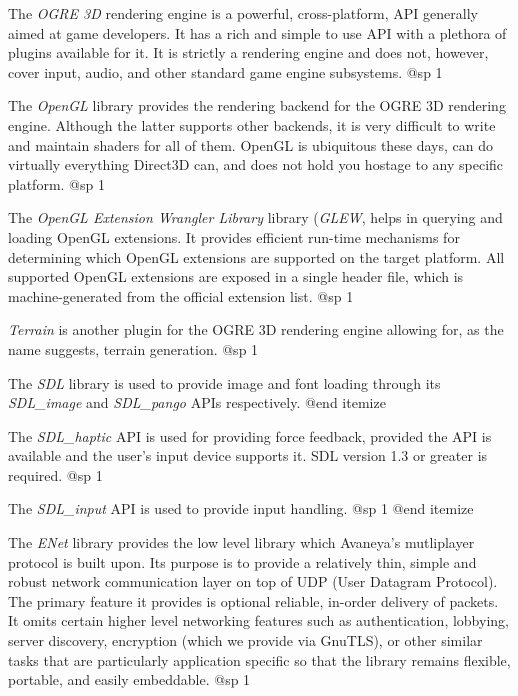 \item
The {\sl OGRE 3D} rendering engine is a powerful, cross-platform, API generally aimed at game developers. It has a rich and simple to use API with a plethora of plugins available for it. It is strictly a rendering engine and does not, however, cover input, audio, and other standard game engine subsystems.
@sp 1

\item
The {\sl OpenGL} library provides the rendering backend for the OGRE 3D rendering engine. Although the latter supports other backends, it is very difficult to write and maintain shaders for all of them. OpenGL is ubiquitous these days, can do virtually everything Direct3D can, and does not hold you hostage to any specific platform.
@sp 1

\item
The {\sl OpenGL Extension Wrangler Library} library ({\sl GLEW}, helps in querying and loading OpenGL extensions. It provides efficient run-time mechanisms for determining which OpenGL extensions are supported on the target platform. All supported OpenGL extensions are exposed in a single header file, which is machine-generated from the official extension list.
@sp 1

\item
{\sl Terrain} is another plugin for the OGRE 3D rendering engine allowing for, as the name suggests, terrain generation.
@sp 1

\item
The {\sl SDL} library is used to provide image and font loading through its {\sl SDL_image} and {\sl SDL_pango} APIs respectively.
@end itemize


\itemize
\item
The {\sl SDL_haptic} API is used for providing force feedback, provided the API is available and the user's input device supports it. SDL version 1.3 or greater is required.
@sp 1

\item
The {\sl SDL_input} API is used to provide input handling.
@sp 1
@end itemize


\itemize
\item
The {\sl ENet} library provides the low level library which Avaneya's mutliplayer protocol is built upon. Its purpose is to provide a relatively thin, simple and robust network communication layer on top of UDP (User Datagram Protocol). The primary feature it provides is optional reliable, in-order delivery of packets. It omits certain higher level networking features such as authentication, lobbying, server discovery, encryption (which we provide via GnuTLS), or other similar tasks that are particularly application specific so that the library remains flexible, portable, and easily embeddable.
@sp 1

